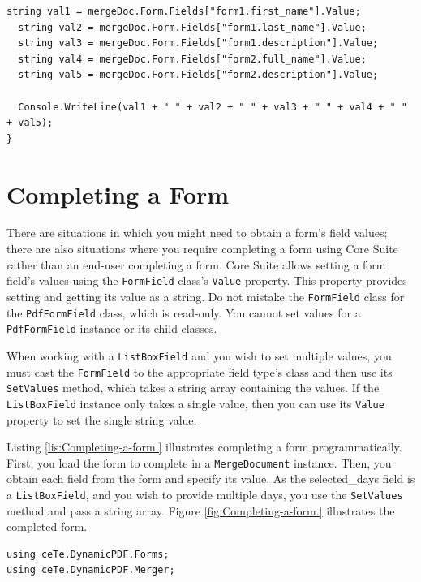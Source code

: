 \documentclass[american]{tufte-book}
\numberwithin{equation}{section}
\numberwithin{figure}{section}
\begin{document}
{{\begin{lstlisting}[caption={Reading two forms.},label={lis:Reading-two-forms.},basicstyle={\footnotesize\ttfamily},breaklines=true]
  string val1 = mergeDoc.Form.Fields["form1.first_name"].Value;
  string val2 = mergeDoc.Form.Fields["form1.last_name"].Value;
  string val3 = mergeDoc.Form.Fields["form1.description"].Value;
  string val4 = mergeDoc.Form.Fields["form2.full_name"].Value;
  string val5 = mergeDoc.Form.Fields["form2.description"].Value;

  Console.WriteLine(val1 + " " + val2 + " " + val3 + " " + val4 + " " + val5);
}
\end{lstlisting}
\leavevmode\egroup


\section{Completing a Form}

There are situations in which you might need to obtain a form's field
values; there are also situations where you require completing a form
using Core Suite rather than an end-user completing a form. Core Suite
allows setting a form field's values using the \texttt{FormField}
class's \texttt{Value} property. This property provides setting and
getting its value as a string. Do not mistake the \texttt{FormField}
class for the \texttt{PdfFormField} class, which is read-only. You
cannot set values for a \texttt{PdfFormField} instance or its child
classes.

When working with a \texttt{ListBoxField} and you wish to set multiple
values, you must cast the \texttt{FormField} to the appropriate field
type's class and then use its \texttt{SetValues} method, which takes
a string array containing the values. If the \texttt{ListBoxField}
instance only takes a single value, then you can use its \texttt{Value}
property to set the single string value.

Listing \ref{lis:Completing-a-form.} illustrates completing a form
programmatically. First, you load the form to complete in a \texttt{MergeDocument}
instance. Then, you obtain each field from the form and specify its
value. As the selected\_days field is a \texttt{ListBoxField}, and
you wish to provide multiple days, you use the \texttt{SetValues}
method and pass a string array. Figure \ref{fig:Completing-a-form.}
illustrates the completed form.

\bgroup{}
\begin{lstlisting}[caption={Completing a form.},label={lis:Completing-a-form.},basicstyle={\footnotesize\ttfamily},breaklines=true]
using ceTe.DynamicPDF.Forms;
using ceTe.DynamicPDF.Merger;


\end{lstlisting}}}
\end{document}
